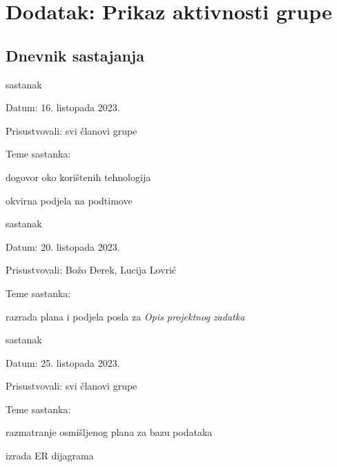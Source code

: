 \chapter*{Dodatak: Prikaz aktivnosti grupe}
		
		\section*{Dnevnik sastajanja}
		
		\begin{packed_enum}
			\item  sastanak
			
			\item[] \begin{packed_item}
				\item Datum: 16. listopada 2023.
				\item Prisustvovali: svi članovi grupe
				\item Teme sastanka:
				\begin{packed_item}
					\item dogovor oko korištenih tehnologija
					\item okvirna podjela na podtimove
				\end{packed_item}
			\end{packed_item}
			
			\item sastanak
			
			\item[] \begin{packed_item}
				\item Datum: 20. listopada 2023.
				\item Prisustvovali: Božo Đerek, Lucija Lovrić
				\item Teme sastanka:
				\begin{packed_item}
					\item razrada plana i podjela posla za \textit{Opis projektnog zadatka}
				\end{packed_item}
			\end{packed_item}
		
			\item  sastanak
			
			\item[] \begin{packed_item}
				\item Datum: 25. listopada 2023.
				\item Prisustvovali: svi članovi grupe
				\item Teme sastanka:
				\begin{packed_item}
					\item razmatranje osmišljenog plana za bazu podataka
					\item izrada ER dijagrama
				\end{packed_item}
			\end{packed_item}
			

\end{packed_enum}
